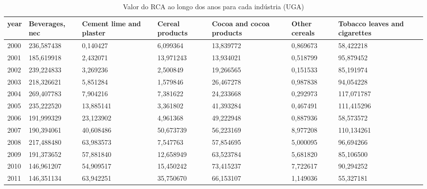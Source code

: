 \begin{table}
\centering
\caption{Valor do RCA ao longo dos anos para cada indústria (UGA)}
\begin{tabular}{p{1cm}p{2cm}p{2cm}p{2cm}p{2cm}p{2cm}p{2cm}}
\toprule
 year &  Beverages, nec &  Cement lime and plaster &  Cereal products &  Cocoa and cocoa products &  Other cereals &  Tobacco leaves and cigarettes \\
\midrule
 2000 &      236,587438 &                 0,140427 &         6,099364 &                 13,839772 &       0,869673 &                      58,422218 \\
 2001 &      185,619918 &                 2,432071 &        13,971243 &                 13,934021 &       0,518799 &                      95,879452 \\
 2002 &      239,224833 &                 3,269236 &         2,500849 &                 19,266565 &       0,151533 &                      85,191974 \\
 2003 &      218,326621 &                 5,851284 &         1,579846 &                 26,467278 &       0,987838 &                      94,054228 \\
 2004 &      269,407783 &                 7,904216 &         7,381622 &                 24,233668 &       0,292973 &                     117,071787 \\
 2005 &      235,222520 &                13,885141 &         3,361802 &                 41,393284 &       0,467491 &                     111,415296 \\
 2006 &      191,999329 &                23,123902 &         4,961368 &                 49,222948 &       0,887936 &                      58,573572 \\
 2007 &      190,394061 &                40,608486 &        50,673739 &                 56,223169 &       8,977208 &                     110,134261 \\
 2008 &      217,488480 &                63,983573 &         7,547763 &                 57,854695 &       5,000095 &                      96,694266 \\
 2009 &      191,373652 &                57,881840 &        12,658949 &                 63,523784 &       5,681820 &                      85,106500 \\
 2010 &      146,961207 &                54,909517 &        15,450242 &                 73,415237 &       7,722617 &                      90,294252 \\
 2011 &      146,351134 &                63,942251 &        35,750670 &                 66,153107 &       1,149036 &                      55,327181 \\

\end{tabular}
\end{table}
